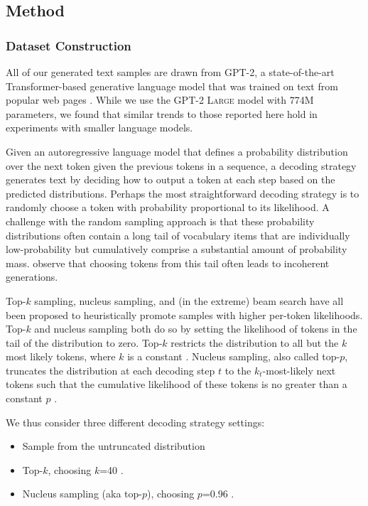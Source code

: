 \subsection{Method}
\subsubsection{Dataset Construction}
All of our generated text samples are drawn from GPT-2, a state-of-the-art Transformer-based generative language model that was trained on text from popular web pages \citep{radford2019language}.
While we use the GPT-2 \textsc{Large} model with 774M parameters, we found that similar trends to those reported here hold in experiments with smaller language models.

Given an autoregressive language model that defines a probability distribution over the next token given the previous tokens in a sequence, a decoding strategy generates text by deciding how to output a token at each step based on the predicted distributions.
Perhaps the most straightforward decoding strategy is to randomly choose a token with probability proportional to its likelihood.
A challenge with the random sampling approach is that these probability distributions  often contain a long tail of vocabulary items that are individually low-probability but cumulatively comprise a substantial amount of probability mass.
\citet{holtzman2019curious} observe that choosing tokens from this tail often leads to incoherent generations.

Top-$k$ sampling, nucleus sampling, and (in the extreme) beam search have all been proposed to heuristically promote samples with higher per-token likelihoods.
Top-$k$ and nucleus sampling both do so by setting the likelihood of tokens in the tail of the distribution to zero.
Top-$k$ restricts the distribution to all but the $k$ most likely tokens, where $k$ is a constant \citep{fan2018hierarchical}.
Nucleus sampling, also called top-$p$, truncates the distribution at each decoding step $t$ to the $k_t$-most-likely next tokens such that the cumulative likelihood of these tokens is no greater than a constant $p$ \citep{holtzman2019curious}.

We thus consider three different decoding strategy settings:
\begin{itemize}[noitemsep,topsep=0pt]
  \item Sample from the untruncated distribution
  \item Top-$k$, choosing $k$=40 \citep{radford2019language}.
  \item Nucleus sampling (aka top-$p$), choosing $p$=0.96 \citep{zellers2019defending}.
\end{itemize}

